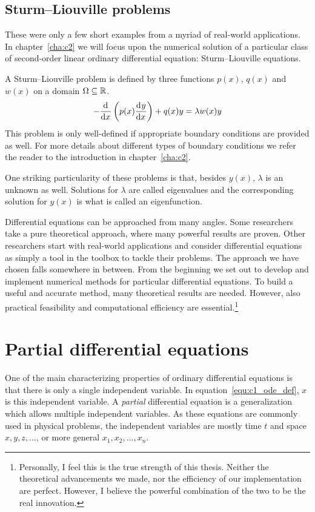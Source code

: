 \subsection{Sturm--Liouville problems}

These were only a few short examples from a myriad of real-world applications. In chapter~\ref{cha:c2} we will focus upon the numerical solution of a particular class of second-order linear ordinary differential equation: Sturm--Liouville equations.

A Sturm--Liouville problem is defined by three functions $p(x)$, $q(x)$ and $w(x)$ on a domain $\Omega \subseteq \mathbb{R}$.
$$
    -{\dv[]{}{x}}\left(p(x) \dv[]{y}{x}\right) + q(x) y = \lambda w(x) y
$$
This problem is only well-defined if appropriate boundary conditions are provided as well. For more details about different types of boundary conditions we refer the reader to the introduction in chapter~\ref{cha:c2}.

One striking particularity of these problems is that, besides $y(x)$, $\lambda$ is an unknown as well. Solutions for $\lambda$ are called eigenvalues and the corresponding solution for $y(x)$ is what is called an eigenfunction.

Differential equations can be approached from many angles. Some researchers take a pure theoretical approach, where many powerful results are proven. Other researchers start with real-world applications and consider differential equations as simply a tool in the toolbox to tackle their problems. The approach we have chosen falls somewhere in between. From the beginning we set out to develop and implement numerical methods for particular differential equations. To build a useful and accurate method, many theoretical results are needed. However, also practical feasibility and computational efficiency are essential.\footnote{Personally, I feel this is the true strength of this thesis. Neither the theoretical advancements we made, nor the efficiency of our implementation are perfect. However, I believe the powerful combination of the two to be the real innovation.}


\section{Partial differential equations}

One of the main characterizing properties of ordinary differential equations is that there is only a single independent variable. In equation~\eqref{equ:c1_ode_def}, $x$ is this independent variable. A \emph{partial} differential equation is a generalization which allows multiple independent variables. As these equations are commonly used in physical problems, the independent variables are mostly time $t$ and space $x, y, z, \dots$, or more general $x_1, x_2, \dots, x_n$.

